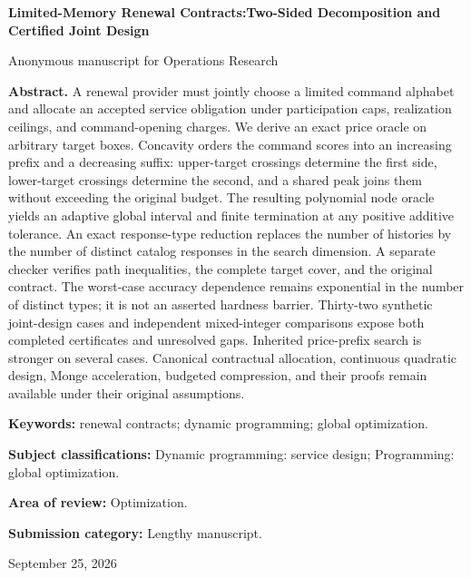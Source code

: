 \documentclass[11pt,letterpaper]{article}
\theoremstyle{definition}\newtheorem{assumption}[theorem]{Assumption}
\begin{document}
\hypersetup{pageanchor=false}
\begin{titlepage}\centering
{\Large\bfseries Limited-Memory Renewal Contracts:\newline Two-Sided Decomposition and Certified Joint Design\par}
\vspace{.3in}Anonymous manuscript for Operations Research\par\vspace{.2in}
\begin{minipage}{\textwidth}\textbf{Abstract.} A renewal provider must jointly choose a limited command alphabet and allocate an accepted service obligation under participation caps, realization ceilings, and command-opening charges. We derive an exact price oracle on arbitrary target boxes. Concavity orders the command scores into an increasing prefix and a decreasing suffix: upper-target crossings determine the first side, lower-target crossings determine the second, and a shared peak joins them without exceeding the original budget. The resulting polynomial node oracle yields an adaptive global interval and finite termination at any positive additive tolerance. An exact response-type reduction replaces the number of histories by the number of distinct catalog responses in the search dimension. A separate checker verifies path inequalities, the complete target cover, and the original contract. The worst-case accuracy dependence remains exponential in the number of distinct types; it is not an asserted hardness barrier. Thirty-two synthetic joint-design cases and independent mixed-integer comparisons expose both completed certificates and unresolved gaps. Inherited price-prefix search is stronger on several cases. Canonical contractual allocation, continuous quadratic design, Monge acceleration, budgeted compression, and their proofs remain available under their original assumptions.
\par\vspace{.15in}\textbf{Keywords:} renewal contracts; dynamic programming; global optimization.
\par\vspace{.1in}\textbf{Subject classifications:} Dynamic programming: service design; Programming: global optimization.
\par\vspace{.1in}\textbf{Area of review:} Optimization.
\par\vspace{.1in}\textbf{Submission category:} Lengthy manuscript.
\end{minipage}\vfill September 25, 2026\end{titlepage}
\end{document}
